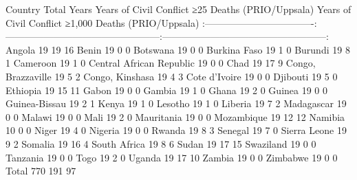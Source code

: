 \documentclass[
]{article}
\begin{document}
\textbar Country \textbar{} Total Years\textbar{} Years of Civil Conﬂict
≥25 Deaths (PRIO/Uppsala)\textbar{} Years of Civil Conﬂict ≥1,000 Deaths
(PRIO/Uppsala)\textbar{}
\textbar:------------------------\textbar----------:\textbar------------------------------------------------:\textbar---------------------------------------------------:\textbar{}
\textbar Angola \textbar{} 19\textbar{} 19\textbar{} 16\textbar{}
\textbar Benin \textbar{} 19\textbar{} 0\textbar{} 0\textbar{}
\textbar Botswana \textbar{} 19\textbar{} 0\textbar{} 0\textbar{}
\textbar Burkina Faso \textbar{} 19\textbar{} 1\textbar{} 0\textbar{}
\textbar Burundi \textbar{} 19\textbar{} 8\textbar{} 1\textbar{}
\textbar Cameroon \textbar{} 19\textbar{} 1\textbar{} 0\textbar{}
\textbar Central African Republic \textbar{} 19\textbar{} 0\textbar{}
0\textbar{} \textbar Chad \textbar{} 19\textbar{} 17\textbar{}
9\textbar{} \textbar Congo, Brazzaville \textbar{} 19\textbar{}
5\textbar{} 2\textbar{} \textbar Congo, Kinshasa \textbar{} 19\textbar{}
4\textbar{} 3\textbar{} \textbar Cote d'Ivoire \textbar{} 19\textbar{}
0\textbar{} 0\textbar{} \textbar Djibouti \textbar{} 19\textbar{}
5\textbar{} 0\textbar{} \textbar Ethiopia \textbar{} 19\textbar{}
15\textbar{} 11\textbar{} \textbar Gabon \textbar{} 19\textbar{}
0\textbar{} 0\textbar{} \textbar Gambia \textbar{} 19\textbar{}
1\textbar{} 0\textbar{} \textbar Ghana \textbar{} 19\textbar{}
2\textbar{} 0\textbar{} \textbar Guinea \textbar{} 19\textbar{}
0\textbar{} 0\textbar{} \textbar Guinea-Bissau \textbar{} 19\textbar{}
2\textbar{} 1\textbar{} \textbar Kenya \textbar{} 19\textbar{}
1\textbar{} 0\textbar{} \textbar Lesotho \textbar{} 19\textbar{}
1\textbar{} 0\textbar{} \textbar Liberia \textbar{} 19\textbar{}
7\textbar{} 2\textbar{} \textbar Madagascar \textbar{} 19\textbar{}
0\textbar{} 0\textbar{} \textbar Malawi \textbar{} 19\textbar{}
0\textbar{} 0\textbar{} \textbar Mali \textbar{} 19\textbar{}
2\textbar{} 0\textbar{} \textbar Mauritania \textbar{} 19\textbar{}
0\textbar{} 0\textbar{} \textbar Mozambique \textbar{} 19\textbar{}
12\textbar{} 12\textbar{} \textbar Namibia \textbar{} 10\textbar{}
0\textbar{} 0\textbar{} \textbar Niger \textbar{} 19\textbar{}
4\textbar{} 0\textbar{} \textbar Nigeria \textbar{} 19\textbar{}
0\textbar{} 0\textbar{} \textbar Rwanda \textbar{} 19\textbar{}
8\textbar{} 3\textbar{} \textbar Senegal \textbar{} 19\textbar{}
7\textbar{} 0\textbar{} \textbar Sierra Leone \textbar{} 19\textbar{}
9\textbar{} 2\textbar{} \textbar Somalia \textbar{} 19\textbar{}
16\textbar{} 4\textbar{} \textbar South Africa \textbar{} 19\textbar{}
8\textbar{} 6\textbar{} \textbar Sudan \textbar{} 19\textbar{}
17\textbar{} 15\textbar{} \textbar Swaziland \textbar{} 19\textbar{}
0\textbar{} 0\textbar{} \textbar Tanzania \textbar{} 19\textbar{}
0\textbar{} 0\textbar{} \textbar Togo \textbar{} 19\textbar{}
2\textbar{} 0\textbar{} \textbar Uganda \textbar{} 19\textbar{}
17\textbar{} 10\textbar{} \textbar Zambia \textbar{} 19\textbar{}
0\textbar{} 0\textbar{} \textbar Zimbabwe \textbar{} 19\textbar{}
0\textbar{} 0\textbar{} \textbar Total \textbar{} 770\textbar{}
191\textbar{} 97\textbar{}
\end{document}
